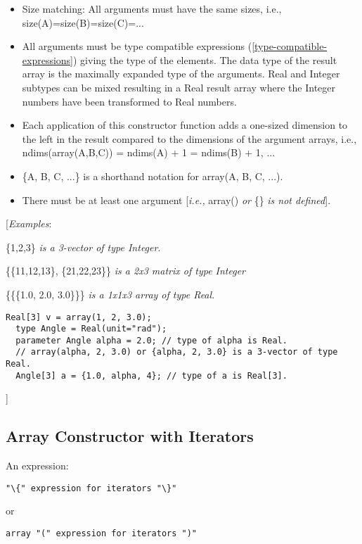 \begin{itemize}
\item
  Size matching: All arguments must have the same sizes, i.e.,
  size(A)=size(B)=size(C)=...
\item
  All arguments must be type compatible expressions (\ref{type-compatible-expressions}) giving
  the type of the elements. The data type of the result array is the
  maximally expanded type of the arguments. Real and Integer subtypes
  can be mixed resulting in a Real result array where the Integer
  numbers have been transformed to Real numbers.
\item
  Each application of this constructor function adds a one-sized
  dimension to the left in the result compared to the dimensions of the
  argument arrays, i.e., ndims(array(A,B,C)) = ndims(A) + 1 = ndims(B) +
  1, ...
\item
  \{A, B, C, ...\} is a shorthand notation for array(A, B, C, ...).
\item
  There must be at least one argument {[}\emph{i.e.,} array() \emph{or}
  \{\} \emph{is not defined}{]}.
\end{itemize}

{[}\emph{Examples}:

\{1,2,3\} \emph{is a 3-vector of type Integer}.

\{\{11,12,13\}, \{21,22,23\}\} \emph{is a 2x3 matrix of type Integer}

\{\{\{1.0, 2.0, 3.0\}\}\} \emph{is a 1x1x3 array of type Real}.

\begin{lstlisting}[language=modelica]
  Real[3] v = array(1, 2, 3.0);
  type Angle = Real(unit="rad");
  parameter Angle alpha = 2.0; // type of alpha is Real.
  // array(alpha, 2, 3.0) or {alpha, 2, 3.0} is a 3-vector of type Real.
  Angle[3] a = {1.0, alpha, 4}; // type of a is Real[3].
\end{lstlisting}
{]}

\subsection{Array Constructor with Iterators}

An expression:
\begin{lstlisting}[language=grammar]
"\{" expression for iterators "\}"
\end{lstlisting}
or
\begin{lstlisting}[language=grammar]
array "(" expression for iterators ")"
\end{lstlisting}

